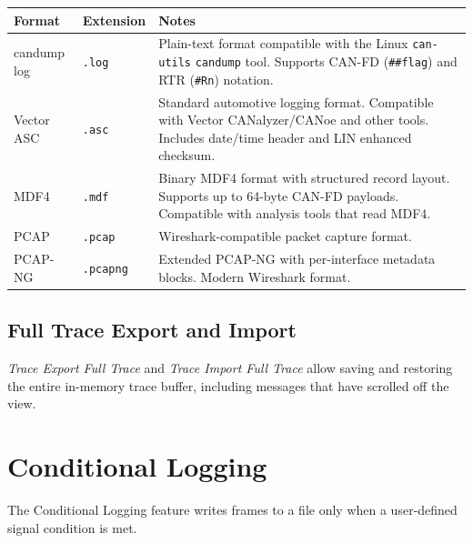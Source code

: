 \documentclass[a4paper,11pt]{article}
\newcommand{\menu}[1]{\textit{#1}}
\newcommand{\file}[1]{\texttt{#1}}
\begin{document}
\begin{longtable}{p{3cm} p{2.5cm} p{7.5cm}}
  \toprule
  \textbf{Format} & \textbf{Extension} & \textbf{Notes} \\
  \midrule
  \endhead
  candump log     & \file{.log}     & Plain-text format compatible with the Linux
                                      \texttt{can-utils} \texttt{candump} tool.
                                      Supports CAN-FD (\texttt{\#\#flag}) and
                                      RTR (\texttt{\#Rn}) notation. \\[0.4em]
  Vector ASC      & \file{.asc}     & Standard automotive logging format.
                                      Compatible with Vector CANalyzer/CANoe and
                                      other tools. Includes date/time header and
                                      LIN enhanced checksum. \\[0.4em]
  MDF4            & \file{.mdf}     & Binary MDF4 format with structured record
                                      layout. Supports up to 64-byte CAN-FD payloads.
                                      Compatible with analysis tools that read MDF4. \\[0.4em]
  PCAP            & \file{.pcap}    & Wireshark-compatible packet capture format. \\[0.4em]
  PCAP-NG         & \file{.pcapng}  & Extended PCAP-NG with per-interface metadata
                                      blocks. Modern Wireshark format. \\
  \bottomrule
\end{longtable}

\subsection{Full Trace Export and Import}

\menu{Trace \textrightarrow{} Export Full Trace} and \menu{Trace \textrightarrow{} Import Full Trace}
allow saving and restoring the entire in-memory trace buffer, including messages
that have scrolled off the view.

\section{Conditional Logging}

The Conditional Logging feature writes frames to a file only when a user-defined
signal condition is met.
\end{document}
